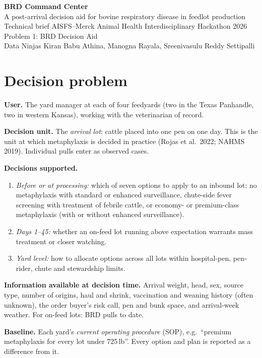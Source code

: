 \documentclass[10pt,letterpaper]{article}
\newcommand{\teamname}{Data Ninjas}
\newcommand{\teammembers}{Kiran Babu Athina, Manogna Rayala, Sreenivasulu Reddy Settipalli}
\newcommand{\lead}[1]{\textbf{#1}\enspace}
\begin{document}
\begin{center}
  {\LARGE\bfseries\color{accent} BRD Command Center}\\[3pt]
  {\large A post-arrival decision aid for bovine respiratory disease in feedlot production}\\[5pt]
  {\small Technical brief \textbullet{} AISFS--Merck Animal Health Interdisciplinary Hackathon 2026 \textbullet{} Problem 1: BRD Decision Aid}\\[2pt]
  {\small \teamname{} \textbullet{} \teammembers}
\end{center}

\section{Decision problem}

\lead{User.} The yard manager at each of four feedyards (two in the Texas Panhandle, two in western Kansas), working with the veterinarian of record.

\lead{Decision unit.} The \emph{arrival lot}: cattle placed into one pen on one day. This is the unit at which metaphylaxis is decided in practice (Rojas et al.\ 2022; NAHMS 2019). Individual pulls enter as observed cases.

\lead{Decisions supported.}
\begin{enumerate}
  \item \emph{Before or at processing:} which of seven options to apply to an inbound lot: no metaphylaxis with standard or enhanced surveillance, chute-side fever screening with treatment of febrile cattle, or economy- or premium-class metaphylaxis (with or without enhanced surveillance).
  \item \emph{Days 1--45:} whether an on-feed lot running above expectation warrants mass treatment or closer watching.
  \item \emph{Yard level:} how to allocate options across all lots within hospital-pen, pen-rider, chute and stewardship limits.
\end{enumerate}

\lead{Information available at decision time.} Arrival weight, head, sex, source type, number of origins, haul and shrink, vaccination and weaning history (often unknown), the order buyer's risk call, pen and bunk space, and arrival-week weather. For on-feed lots: BRD pulls to date.

\lead{Baseline.} Each yard's \emph{current operating procedure} (SOP), e.g.\ ``premium metaphylaxis for every lot under 725\,lb''. Every option and plan is reported as a difference from it.
\end{document}

